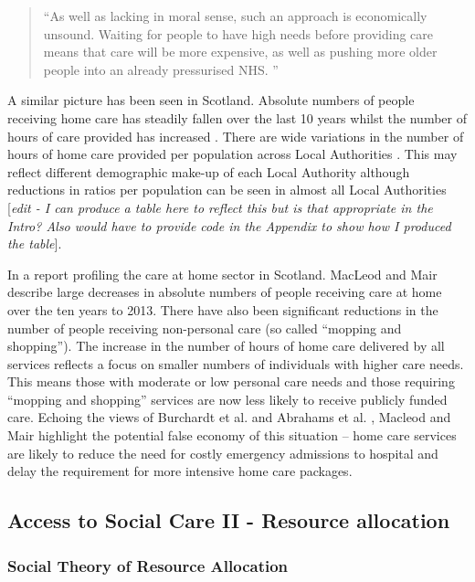 \documentclass[12pt,]{report}
\begin{document}
\begin{quotation}
    “As well as lacking in moral sense, such an approach is economically unsound. Waiting for people to have high needs before providing care means that care will be more expensive, as well as pushing more older people into an already pressurised NHS. ” \end{quotation}

\citep[pp.5]{RN177}

A similar picture has been seen in Scotland. Absolute numbers of people
receiving home care has steadily fallen over the last 10 years whilst
the number of hours of care provided has increased \citep{RN128}. There
are wide variations in the number of hours of home care provided per
population across Local Authorities \citep{RN128}. This may reflect
different demographic make-up of each Local Authority although
reductions in ratios per population can be seen in almost all Local
Authorities {[}\emph{edit - I can produce a table here to reflect this
but is that appropriate in the Intro? Also would have to provide code in
the Appendix to show how I produced the table}{]}.

In a report profiling the care at home sector in Scotland. MacLeod and
Mair \citeyearpar{RN147} describe large decreases in absolute numbers of
people receiving care at home over the ten years to 2013. There have
also been significant reductions in the number of people receiving
non-personal care (so called ``mopping and shopping''). The increase in
the number of hours of home care delivered by all services reflects a
focus on smaller numbers of individuals with higher care needs. This
means those with moderate or low personal care needs and those requiring
``mopping and shopping'' services are now less likely to receive
publicly funded care. Echoing the views of Burchardt et al.
\citeyearpar{RN173} and Abrahams et al. \citeyearpar{RN177}, Macleod and
Mair \citeyearpar{RN147} highlight the potential false economy of this
situation -- home care services are likely to reduce the need for costly
emergency admissions to hospital and delay the requirement for more
intensive home care packages.

\subsection{Access to Social Care II - Resource allocation}\label{subsec:access-resources}

\subsubsection{Social Theory of Resource Allocation}\label{subsubsec:theory-resources}
\end{document}
